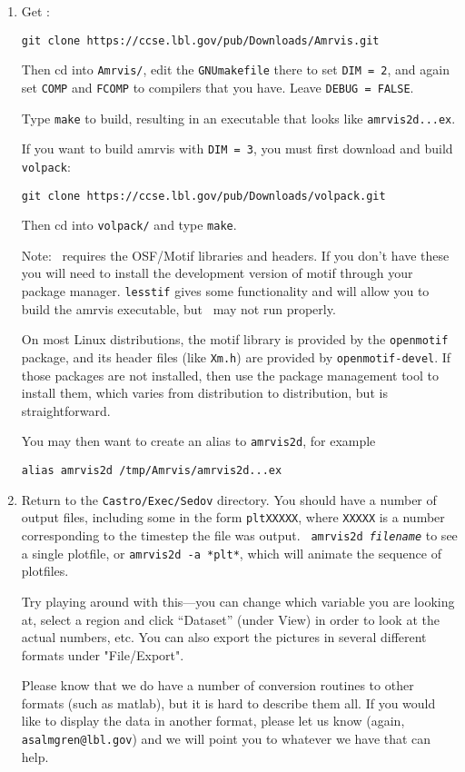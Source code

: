 \begin{enumerate}

\item Get \amrvis:
\begin{verbatim}
git clone https://ccse.lbl.gov/pub/Downloads/Amrvis.git
\end{verbatim}

Then cd into {\tt Amrvis/}, edit the {\tt GNUmakefile} there
to set {\tt DIM = 2}, and again set {\tt COMP} and {\tt FCOMP} to compilers that
you have. Leave {\tt DEBUG = FALSE}.

Type {\tt make} to build, resulting in an executable that
looks like {\tt amrvis2d...ex}.

If you want to build amrvis with {\tt DIM = 3}, you must first
download and build {\tt volpack}:
\begin{verbatim}
git clone https://ccse.lbl.gov/pub/Downloads/volpack.git
\end{verbatim}

Then cd into {\tt volpack/} and type {\tt make}.

Note: \amrvis\ requires the OSF/Motif libraries and headers. If you don't have these 
you will need to install the development version of motif through your package manager. 
{\tt lesstif} gives some functionality and will allow you to build the amrvis executable, 
but \amrvis\ may not run properly.

On most Linux distributions, the motif library is provided by the
{\tt openmotif} package, and its header files (like {\tt Xm.h}) are provided
by {\tt openmotif-devel}. If those packages are not installed, then use the
package management tool to install them, which varies from
distribution to distribution, but is straightforward. 

You may then want to create an alias to {\tt amrvis2d}, for example
\begin{verbatim}
alias amrvis2d /tmp/Amrvis/amrvis2d...ex
\end{verbatim}

\item Return to the {\tt Castro/Exec/Sedov} directory.  You should
  have a number of output files, including some in the form {\tt *pltXXXXX},
  where {\tt XXXXX} is a number corresponding to the timestep the file
  was output.  {\tt
    amrvis2d {\em filename}} to see a single plotfile, or {\tt amrvis2d -a
  *plt*}, which will animate the sequence of plotfiles.

  Try playing
  around with this---you can change which variable you are
  looking at, select a region and click ``Dataset'' (under View)
  in order to look at the actual numbers, etc. You can also export the
  pictures in several different formats under "File/Export".

Please know that we do have a number of conversion routines to other
formats (such as matlab), but it is hard to describe them all. If you
would like to display the data in another format, please let us know
(again, {\tt asalmgren@lbl.gov}) and we will point you to whatever we have
that can help.

\end{enumerate}

